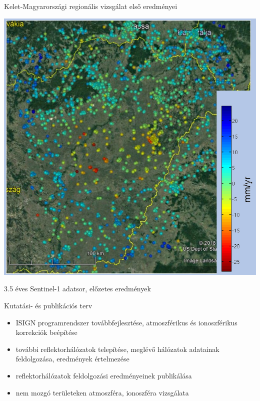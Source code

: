 \documentclass{beamer}
\begin{document}
\begin{frame}{Kelet-Magyarországi regionális vizsgálat első eredményei}
    \begin{minipage}[c]{0.675\textwidth}
        \includegraphics[width=1.0\textwidth]{hun_nkp2.png}
    \end{minipage}
    \hspace{10pt}
    \begin{minipage}[c]{0.25\textwidth}
        3.5 éves Sentinel-1 adatsor, előzetes eredmények
    \end{minipage}
\end{frame}


\begin{frame}{Kutatási- és publikációs terv}

\begin{itemize}
    \item ISIGN programrendszer továbbfejlesztése, atmoszférikus
    és ionoszférikus korrekciók beépítése
    \item további reflektorhálózatok telepítése, meglévő hálózatok adatainak
    feldolgozása, eredmények értelmezése
    \item reflektorhálózatok feldolgozási eredményeinek publikálása
    \item nem mozgó területeken atmoszféra, ionoszféra vizsgálata
\end{itemize}

\end{frame}
\end{document}
